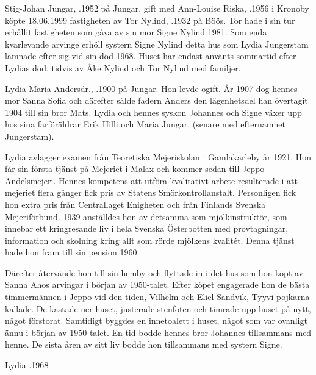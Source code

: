 
Stig-Johan Jungar, .1952 på Jungar,  gift med Ann-Louise Riska, .1956 i Kronoby köpte 18.06.1999 fastigheten av Tor Nylind, .1932 på Böös. Tor hade i sin tur erhållit fastigheten som gåva av sin mor Signe Nylind 1981.
Som enda kvarlevande arvinge erhöll systern Signe Nylind detta hus som Lydia Jungerstam lämnade efter sig vid sin död 1968. Huset har endast använts sommartid efter Lydias död, tidvis av Åke Nylind och Tor Nylind med familjer.


Lydia Maria Andersdr., .1900 på Jungar. Hon levde ogift. År 1907 dog hennes mor Sanna Sofia och därefter sålde fadern Anders den lägenhetsdel han övertagit 1904 till sin bror Mats. Lydia och hennes syskon Johannes och Signe växer upp hos sina farföräldrar Erik Hilli och Maria Jungar, (senare med efternamnet Jungerstam).

Lydia avlägger examen från Teoretiska Mejeriskolan i Gamlakarleby år 1921. Hon får sin första tjänst på Mejeriet i Malax och kommer sedan till Jeppo Andelsmejeri. Hennes kompetens att utföra kvalitativt arbete resulterade i att mejeriet flera gånger fick pris av Statens Smörkontrollanstalt. Personligen fick hon extra pris från Centrallaget Enigheten och från Finlands Svenska Mejeriförbund. 1939 anställdes hon av detsamma som mjölkinstruktör, som innebar ett kringresande liv i hela Svenska Österbotten med provtagningar, information och skolning kring allt som rörde mjölkens kvalitét. Denna tjänst hade hon fram till sin pension 1960.

Därefter återvände hon till sin hemby och flyttade in i det hus som hon köpt av Sanna Ahos arvingar i början av 1950-talet. Efter köpet engagerade hon de bästa timmermännen i Jeppo vid den tiden, Vilhelm och Eliel Sandvik, Tyyvi-pojkarna kallade. De kastade ner huset, justerade stenfoten och timrade upp huset på nytt, något förstorat. Samtidigt byggdes en innetoalett i huset, något som var ovanligt ännu i början av 1950-talet. En tid bodde hennes bror Johannes tillsammans med henne. De sista åren av sitt liv bodde hon tillsammans med systern Signe.

Lydia .1968


